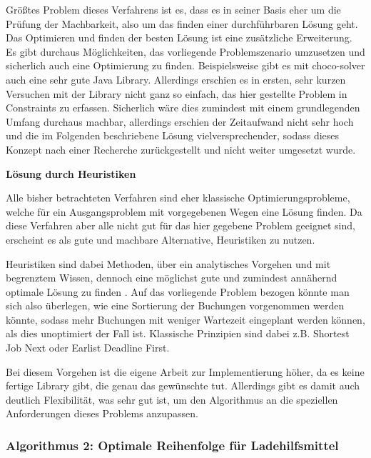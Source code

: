 Größtes Problem dieses Verfahrens ist es, dass es in seiner Basis eher um die Prüfung der Machbarkeit, also um das finden einer durchführbaren Lösung geht. Das Optimieren und finden der besten Lösung ist eine zusätzliche Erweiterung. \cite{constraintProgramming} Es gibt durchaus Möglichkeiten, das vorliegende Problemszenario umzusetzen und sicherlich auch eine Optimierung zu finden. Beispielsweise gibt es mit \glqq{}choco-solver\grqq{} \cite{chocoSolver} auch eine sehr gute Java Library. Allerdings erschien es in ersten, sehr kurzen Versuchen mit der Library nicht ganz so einfach, das hier gestellte Problem in Constraints zu erfassen. Sicherlich wäre dies zumindest mit einem grundlegenden Umfang durchaus machbar, allerdings erschien der Zeitaufwand nicht sehr hoch und die im Folgenden beschriebene Lösung vielversprechender, sodass dieses Konzept nach einer Recherche zurückgestellt und nicht weiter umgesetzt wurde.


\textbf{Lösung durch Heuristiken}

Alle bisher betrachteten Verfahren sind eher klassische Optimierungsprobleme, welche für ein Ausgangsproblem mit vorgegebenen Wegen eine Lösung finden. Da diese Verfahren aber alle nicht gut für das hier gegebene Problem geeignet sind, erscheint es als gute und machbare Alternative, Heuristiken zu nutzen.

Heuristiken sind dabei Methoden, über ein analytisches Vorgehen und mit begrenztem Wissen, dennoch eine möglichst gute und zumindest annähernd optimale Lösung zu finden . Auf das vorliegende Problem bezogen könnte man sich also überlegen, wie eine Sortierung der Buchungen vorgenommen werden könnte, sodass mehr Buchungen mit weniger Wartezeit eingeplant werden können, als dies unoptimiert der Fall ist. Klassische Prinzipien sind dabei z.B. \glqq{}Shortest Job Next\grqq{} oder \glqq{}Earlist Deadline First\grqq{}. 

Bei diesem Vorgehen ist die eigene Arbeit zur Implementierung höher, da es keine fertige Library gibt, die genau das gewünschte tut. Allerdings gibt es damit auch deutlich Flexibilität, was sehr gut ist, um den Algorithmus an die speziellen Anforderungen dieses Problems anzupassen.


\subsubsection{Algorithmus 2: Optimale Reihenfolge für Ladehilfsmittel}

